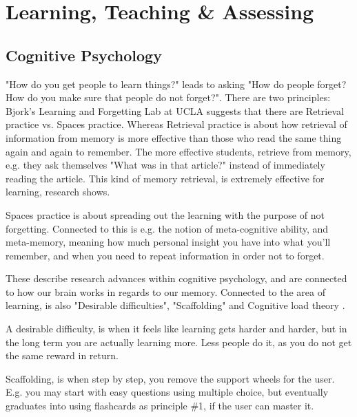 \section{Learning, Teaching \& Assessing}






\subsection{Cognitive Psychology}
"How do you get people to learn things?" leads to asking "How do people forget? How do you make sure that people do not forget?". There are two principles: Bjork's Learning and Forgetting Lab at UCLA\citep{learning-ucla} suggests that there are Retrieval practice vs. Spaces practice. Whereas Retrieval practice is about how retrieval of information from memory is more effective than those who read the same thing again and again to remember. The more effective students, retrieve from memory, e.g. they ask themselves "What was in that article?" instead of immediately reading the article. This kind of memory retrieval, is extremely effective for learning, research shows.

Spaces practice is about spreading out the learning with the purpose of not forgetting. Connected to this is e.g. the notion of meta-cognitive ability, and meta-memory, meaning how much personal insight you have into what you'll remember, and when you need to repeat information in order not to forget.

These describe research advances within cognitive psychology, and are connected to how our brain works in regards to our memory. Connected to the area of learning, is also "Desirable difficulties", "Scaffolding" and Cognitive load theory \citep{effectivelearning-lab}. 

A desirable difficulty, is when it feels like learning gets harder and harder, but in the long term you are actually learning more. Less people do it, as you do not get the same reward in return.

Scaffolding, is when step by step, you remove the support wheels for the user. E.g. you may start with easy questions using multiple choice, but eventually graduates into using flashcards as principle \#1, if the user can master it.

